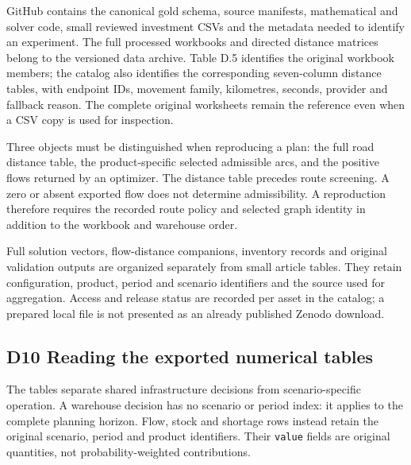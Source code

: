 \documentclass[
  english,
  11pt,
  a4paper,
]{article}
\begin{document}
GitHub contains the canonical gold schema, source manifests,
mathematical and solver code, small reviewed investment CSVs and the
metadata needed to identify an experiment. The full processed workbooks
and directed distance matrices belong to the versioned data archive.
Table D.5 identifies the original workbook members; the catalog also
identifies the corresponding seven-column distance tables, with endpoint
IDs, movement family, kilometres, seconds, provider and fallback reason.
The complete original worksheets remain the reference even when a CSV
copy is used for inspection.

Three objects must be distinguished when reproducing a plan: the full
road distance table, the product-specific selected admissible arcs, and
the positive flows returned by an optimizer. The distance table precedes
route screening. A zero or absent exported flow does not determine
admissibility. A reproduction therefore requires the recorded route
policy and selected graph identity in addition to the workbook and
warehouse order.

Full solution vectors, flow-distance companions, inventory records and
original validation outputs are organized separately from small article
tables. They retain configuration, product, period and scenario
identifiers and the source used for aggregation. Access and release
status are recorded per asset in the catalog; a prepared local file is
not presented as an already published Zenodo download.

\subsection{D10 Reading the exported numerical
tables}\label{d10-reading-the-exported-numerical-tables}

The tables separate shared infrastructure decisions from
scenario-specific operation. A warehouse decision has no scenario or
period index: it applies to the complete planning horizon. Flow, stock
and shortage rows instead retain the original scenario, period and
product identifiers. Their \texttt{value} fields are original
quantities, not probability-weighted contributions.
\end{document}
